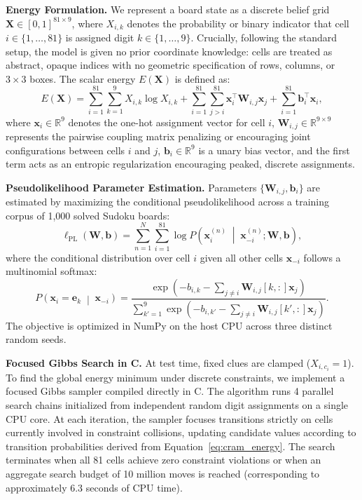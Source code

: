 \documentclass{article} %
\begin{document}
\textbf{Energy Formulation.} We represent a board state as a discrete belief grid $\mathbf{X} \in [0, 1]^{81 \times 9}$, where $X_{i, k}$ denotes the probability or binary indicator that cell $i \in \{1, \dots, 81\}$ is assigned digit $k \in \{1, \dots, 9\}$. Crucially, following the standard setup, the model is given no prior coordinate knowledge: cells are treated as abstract, opaque indices with no geometric specification of rows, columns, or $3 \times 3$ boxes. The scalar energy $E(\mathbf{X})$ is defined as:
\begin{equation}
    E(\mathbf{X}) = \sum_{i=1}^{81} \sum_{k=1}^9 X_{i,k} \log X_{i,k} + \sum_{i=1}^{81} \sum_{j > i}^{81} \mathbf{x}_i^\top \mathbf{W}_{i,j} \mathbf{x}_j + \sum_{i=1}^{81} \mathbf{b}_i^\top \mathbf{x}_i,
    \label{eq:cram_energy}
\end{equation}
where $\mathbf{x}_i \in \mathbb{R}^9$ denotes the one-hot assignment vector for cell $i$, $\mathbf{W}_{i,j} \in \mathbb{R}^{9 \times 9}$ represents the pairwise coupling matrix penalizing or encouraging joint configurations between cells $i$ and $j$, $\mathbf{b}_i \in \mathbb{R}^9$ is a unary bias vector, and the first term acts as an entropic regularization encouraging peaked, discrete assignments.

\textbf{Pseudolikelihood Parameter Estimation.} Parameters $\{\mathbf{W}_{i,j}, \mathbf{b}_i\}$ are estimated by maximizing the conditional pseudolikelihood across a training corpus of 1,000 solved Sudoku boards:
\begin{equation}
    \ell_{\mathrm{PL}}(\mathbf{W}, \mathbf{b}) = \sum_{n=1}^{N} \sum_{i=1}^{81} \log P\left(\mathbf{x}_i^{(n)} \;\middle|\; \mathbf{x}_{-i}^{(n)}; \mathbf{W}, \mathbf{b}\right),
\end{equation}
where the conditional distribution over cell $i$ given all other cells $\mathbf{x}_{-i}$ follows a multinomial softmax:
\begin{equation}
    P\left(\mathbf{x}_i = \mathbf{e}_k \;\middle|\; \mathbf{x}_{-i}\right) = \frac{\exp\left( - b_{i,k} - \sum_{j \neq i} \mathbf{W}_{i,j}[k, :] \mathbf{x}_j \right)}{\sum_{k'=1}^9 \exp\left( - b_{i,k'} - \sum_{j \neq i} \mathbf{W}_{i,j}[k', :] \mathbf{x}_j \right)}.
\end{equation}
The objective is optimized in NumPy on the host CPU across three distinct random seeds.

\textbf{Focused Gibbs Search in C.} At test time, fixed clues are clamped ($X_{i, c_i} = 1$). To find the global energy minimum under discrete constraints, we implement a focused Gibbs sampler compiled directly in C. The algorithm runs 4 parallel search chains initialized from independent random digit assignments on a single CPU core. At each iteration, the sampler focuses transitions strictly on cells currently involved in constraint collisions, updating candidate values according to transition probabilities derived from Equation~\ref{eq:cram_energy}. The search terminates when all 81 cells achieve zero constraint violations or when an aggregate search budget of 10 million moves is reached (corresponding to approximately 6.3 seconds of CPU time).
\end{document}
